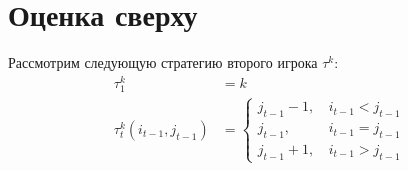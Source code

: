 \section{Оценка сверху}
\label{sec:upper_bound}
Рассмотрим следующую стратегию второго игрока $ \tau^k $:
\begin{equation}
\label{eq:strategy:sp}
\begin{aligned}
\tau_1^k &= k \\
\tau_t^k(i_{t-1}, j_{t-1}) &= \begin{cases}
    j_{t-1} - 1, &\, i_{t-1} < j_{t-1} \\
    j_{t-1}, &\, i_{t-1} = j_{t-1} \\
    j_{t-1} + 1, &\, i_{t-1} > j_{t-1}
\end{cases}
\end{aligned}
\end{equation}


